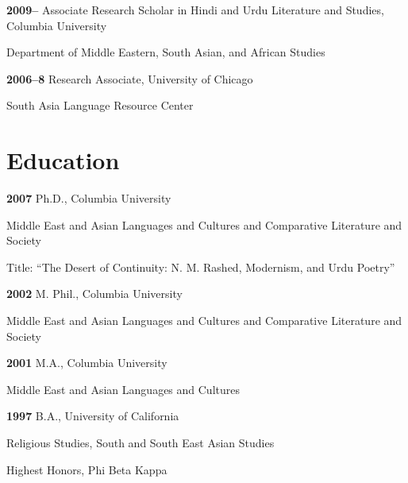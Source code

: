 \documentclass[letterpaper,12pt]{article}
\newenvironment{DUlineblock}[1]{%
    \list{}{\setlength{\partopsep}{\parskip}
            \addtolength{\partopsep}{\baselineskip}
            \setlength{\topsep}{0pt}
            \setlength{\itemsep}{0.15\baselineskip}
            \setlength{\parsep}{0pt}
            \setlength{\leftmargin}{#1}}
    \raggedright
  }
  {\endlist}
\begin{document}
\begin{DUlineblock}{0em}
\item[] \textbf{2009–}
Associate Research Scholar in Hindi and Urdu Literature and Studies, Columbia University
\item[]
\begin{DUlineblock}{\DUlineblockindent}
\item[] Department of Middle Eastern, South Asian, and African Studies
\end{DUlineblock}
\item[] \textbf{2006–8}
Research Associate, University of Chicago
\item[]
\begin{DUlineblock}{\DUlineblockindent}
\item[] South Asia Language Resource Center
\end{DUlineblock}
\end{DUlineblock}


\section{Education%
  \label{education}%
}

\begin{DUlineblock}{0em}
\item[] \textbf{2007}
Ph.D., Columbia University
\item[]
\begin{DUlineblock}{\DUlineblockindent}
\item[] Middle East and Asian Languages and Cultures and Comparative Literature and Society
\item[] Title: “The Desert of Continuity: N. M. Rashed, Modernism, and Urdu Poetry”
\end{DUlineblock}
\item[] \textbf{2002}
M. Phil., Columbia University
\item[]
\begin{DUlineblock}{\DUlineblockindent}
\item[] Middle East and Asian Languages and Cultures and Comparative Literature and Society
\end{DUlineblock}
\item[] \textbf{2001}
M.A., Columbia University
\item[]
\begin{DUlineblock}{\DUlineblockindent}
\item[] Middle East and Asian Languages and Cultures
\end{DUlineblock}
\item[] \textbf{1997}
B.A., University of California
\item[]
\begin{DUlineblock}{\DUlineblockindent}
\item[] Religious Studies, South and South East Asian Studies
\item[] Highest Honors, Phi Beta Kappa
\end{DUlineblock}
\end{DUlineblock}
\end{document}
